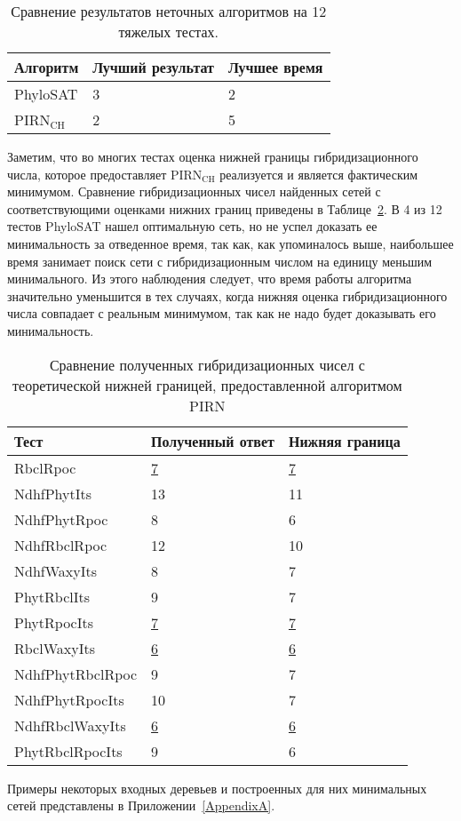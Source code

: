 \begin{table}[t]
\caption{Сравнение результатов неточных алгоритмов на 12 тяжелых тестах.}
\centering
\begin{tabular}{l | l | l}
	Алгоритм & Лучший результат & Лучшее время \\
	\hline
	PhyloSAT & 3 & 2 \\
	PIRN$\mathrm{_{CH}}$ & 2 & 5 \\
\end{tabular}
\label{results-comparison-table}
\end{table}

Заметим, что во многих тестах оценка нижней границы гибридизационного числа, которое предоставляет PIRN$\mathrm{_{CH}}$ реализуется и является фактическим минимумом.
Сравнение гибридизационных чисел найденных сетей с соответствующими оценками нижних границ приведены в Таблице~\ref{lower-bound-table}.
В 4 из 12 тестов PhyloSAT нашел оптимальную сеть, но не успел доказать ее минимальность за отведенное время, так как, как упоминалось выше, наибольшее время занимает поиск сети с гибридизационным числом на единицу меньшим минимального.
Из этого наблюдения следует, что время работы алгоритма значительно уменьшится в тех случаях, когда нижняя оценка гибридизационного числа совпадает с реальным минимумом, так как не надо будет доказывать его минимальность.

\begin{table}[t]
\caption{Сравнение полученных гибридизационных чисел с теоретической нижней границей, предоставленной алгоритмом PIRN}
\centering
\begin{tabular}{l | l | l}
	Тест & Полученный ответ & Нижняя граница \\
	\hline
	RbclRpoc & \underline{7} & \underline{7} \\
	NdhfPhytIts & 13 & 11 \\
	NdhfPhytRpoc & 8 & 6 \\
	NdhfRbclRpoc & 12 & 10 \\
	NdhfWaxyIts & 8 & 7 \\
	PhytRbclIts & 9 & 7 \\
	PhytRpocIts & \underline{7} & \underline{7} \\
	RbclWaxyIts & \underline{6} & \underline{6} \\
	NdhfPhytRbclRpoc & 9 & 7 \\
	NdhfPhytRpocIts & 10 & 7 \\
	NdhfRbclWaxyIts & \underline{6} & \underline{6} \\
	PhytRbclRpocIts & 9 & 6 \\
\end{tabular}
\label{lower-bound-table}
\end{table}

Примеры некоторых входных деревьев и построенных для них минимальных сетей представлены в Приложении~\ref{AppendixA}.
